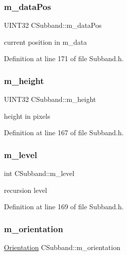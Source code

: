 \subsubsection{\texorpdfstring{m\_dataPos}{m\_dataPos}}
{\footnotesize\ttfamily U\+I\+N\+T32 C\+Subband\+::m\+\_\+data\+Pos\hspace{0.3cm}{\ttfamily [private]}}



current position in m\+\_\+data 



Definition at line 171 of file Subband.\+h.

\mbox{\label{classCSubband_a7c442889ba89b9b46af24392b9c65ee6}} 
\subsubsection{\texorpdfstring{m\_height}{m\_height}}
{\footnotesize\ttfamily U\+I\+N\+T32 C\+Subband\+::m\+\_\+height\hspace{0.3cm}{\ttfamily [private]}}



height in pixels 



Definition at line 167 of file Subband.\+h.

\mbox{\label{classCSubband_a9deef80f2ba4a3d119411e96496987de}} 
\subsubsection{\texorpdfstring{m\_level}{m\_level}}
{\footnotesize\ttfamily int C\+Subband\+::m\+\_\+level\hspace{0.3cm}{\ttfamily [private]}}



recursion level 



Definition at line 169 of file Subband.\+h.

\mbox{\label{classCSubband_a7fe0ebc633e4d07fa938a561a68f596f}} 
\subsubsection{\texorpdfstring{m\_orientation}{m\_orientation}}
{\footnotesize\ttfamily \mbox{\hyperlink{PGFtypes_8h_a871118a09520247c78a71ecd7b0abd58}{Orientation}} C\+Subband\+::m\+\_\+orientation\hspace{0.3cm}{\ttfamily [private]}}



